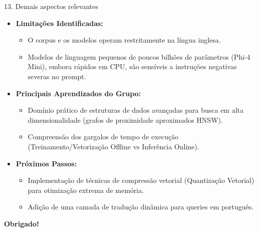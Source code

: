 \documentclass[10pt, aspectratio=169]{beamer}
\begin{document}
\begin{frame}{13. Demais aspectos relevantes}
    \begin{itemize}
        \item \textbf{Limitações Identificadas:}
        \begin{itemize}
            \item O corpus e os modelos operam restritamente na língua inglesa.
            \item Modelos de linguagem pequenos de poucos bilhões de parâmetros (Phi-4 Mini), embora rápidos em CPU, são sensíveis a instruções negativas severas no prompt.
        \end{itemize}
        \vspace{0.2cm}
        \item \textbf{Principais Aprendizados do Grupo:}
        \begin{itemize}
            \item Domínio prático de estruturas de dados avançadas para busca em alta dimensionalidade (grafos de proximidade aproximados HNSW).
            \item Compreensão dos gargalos de tempo de execução (Treinamento/Vetorização Offline vs Inferência Online).
        \end{itemize}
        \vspace{0.2cm}
        \item \textbf{Próximos Passos:}
        \begin{itemize}
            \item Implementação de técnicas de compressão vetorial (Quantização Vetorial) para otimização extrema de memória.
            \item Adição de uma camada de tradução dinâmica para queries em português.
        \end{itemize}
    \end{itemize}
\end{frame}

\begin{frame}
    \begin{center}
        \Huge \textbf{Obrigado!} \\
        \vspace{1cm}
    \end{center}
\end{frame}
\end{document}
